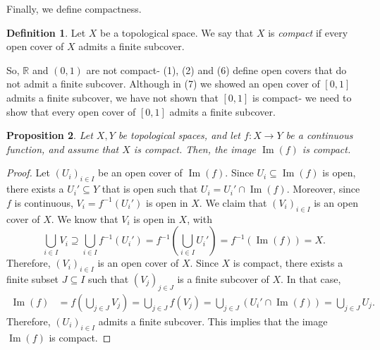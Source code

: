 \documentclass[a4paper, openany]{memoir}
\theoremstyle{definition}
\newtheorem{definition}{Definition}[section]
\theoremstyle{plain}
\newtheorem{proposition}[definition]{Proposition}
\begin{document}
Finally, we define compactness.
\begin{definition}
Let $X$ be a topological space. We say that $X$ is \emph{compact} if every open cover of $X$ admits a finite subcover.
\end{definition}
\noindent So, $\mathbb{R}$ and $(0, 1)$ are not compact- (1), (2) and (6) define open covers that do not admit a finite subcover. Although in (7) we showed an open cover of $[0, 1]$ admits a finite subcover, we have not shown that $[0, 1]$ is compact- we need to show that every open cover of $[0, 1]$ admits a finite subcover.

\begin{proposition}
Let $X, Y$ be topological spaces, and let $f: X \to Y$ be a continuous function, and assume that $X$ is compact. Then, the image $\operatorname{Im}(f)$ is compact.
\end{proposition}
\begin{proof}
Let $(U_i)_{i \in I}$ be an open cover of $\operatorname{Im}(f)$. Since $U_i \subseteq \operatorname{Im}(f)$ is open, there exists a $U_i' \subseteq Y$ that is open such that $U_i = U_i' \cap \operatorname{Im}(f)$. Moreover, since $f$ is continuous, $V_i = f^{-1}(U_i')$ is open in $X$. We claim that $(V_i)_{i \in I}$ is an open cover of $X$. We know that $V_i$ is open in $X$, with
\[\bigcup_{i \in I} V_i \supseteq \bigcup_{i \in I} f^{-1}(U_i') = f^{-1}(\bigcup_{i \in I} U_i') = f^{-1}(\operatorname{Im}(f)) = X.\]
Therefore, $(V_i)_{i \in I}$ is an open cover of $X$. Since $X$ is compact, there exists a finite subset $J \subseteq I$ such that $(V_j)_{j \in J}$ is a finite subcover of $X$. In that case,
\begin{align*}
    \operatorname{Im}(f) &= f(\bigcup_{j \in J} V_j) = \bigcup_{j \in J} f(V_j) = \bigcup_{j \in J} (U_i' \cap \operatorname{Im}(f)) = \bigcup_{j \in J} U_j.
\end{align*}
Therefore, $(U_i)_{i \in I}$ admits a finite subcover. This implies that the image $\operatorname{Im}(f)$ is compact.
\end{proof}
\end{document}
